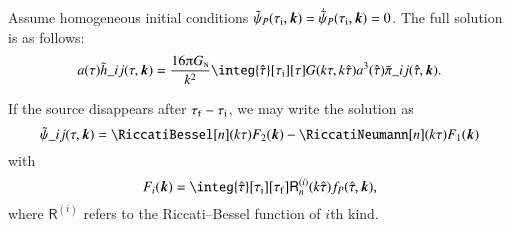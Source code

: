         
    Assume homogeneous initial conditions $\tilde{\psi}_P(\tau_\mathrm{i}, \boldsymbol{k})= \dot{\tilde{\psi}}_P(\tau_\mathrm{i}, \boldsymbol{k})=0$. 
    The full solution is as follows:
    \begin{equation}\label{eq:GR:gws:hij_expression_of_Greens_and_source}
        a(\tau)\Ft{h}\_{ij}(\tau, \vec{k}) = \frac{16\ppi G\nped{N}}{k^2} \integ{\dummy{\tau}}[\tau\ped{i}][\tau] G(k\tau, k\dummy{\tau})a^3(\dummy{\tau}) \Ft{\pi}\_{ij}(\dummy{\tau}, \vec{k}). 
    \end{equation}

    If the source disappears after $\tau_\mathrm{f}-\tau_\mathrm{i}$, we may write the solution as
    \begin{equation}
        \Ft{\ah}\_{ij}(\tau, \vec{k})  = \RiccatiBessel[n](k\tau) F_2(\vec{k}) - \RiccatiNeumann[n](k\tau) F_1(\vec{k})
    \end{equation}
    with
    \begin{equation}
        F_{i}(\vec{k}) = \integ{\dummy{\tau}}[\tau\ped{i}][\tau\ped{f}]\mathsf{R}_n^{(i)}(k\dummy{\tau}) f_P(\dummy{\tau}, \vec{k}) ,
    \end{equation}
    where $\mathsf{R}^{(i)}$ refers to the Riccati--Bessel function of $i$th kind.



